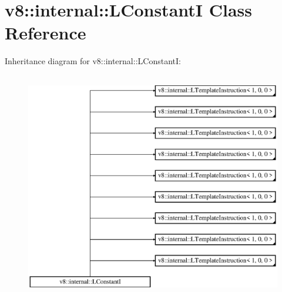 \hypertarget{classv8_1_1internal_1_1_l_constant_i}{}\section{v8\+:\+:internal\+:\+:L\+ConstantI Class Reference}
\label{classv8_1_1internal_1_1_l_constant_i}
Inheritance diagram for v8\+:\+:internal\+:\+:L\+ConstantI\+:\begin{figure}[H]
\begin{center}
\leavevmode
\includegraphics[height=10.000000cm]{classv8_1_1internal_1_1_l_constant_i}
\end{center}
\end{figure}
